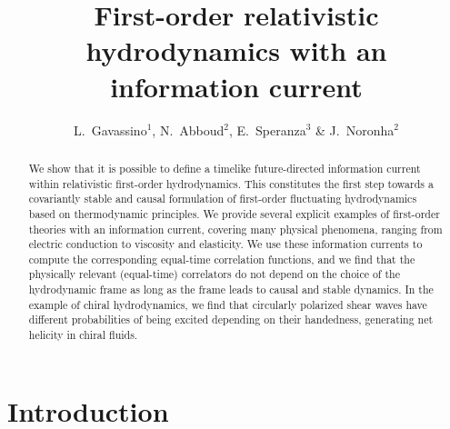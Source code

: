 \documentclass[a4paper, amsfonts, amssymb, amsmath, reprint, showkeys, nofootinbib, twoside,notitlepage,onecolumn,preprintnumbers]{revtex4-2}
\theoremstyle{definition}
\theoremstyle{theorem}
\theoremstyle{corollary}
\begin{document}
\title{First-order relativistic hydrodynamics with an information current}
\author{L.~Gavassino$^1$, N.~Abboud$^2$, E.~Speranza$^3$   \& J.~Noronha$^2$}

\begin{abstract}
We show that it is possible to define a timelike future-directed information current within relativistic first-order hydrodynamics. This constitutes the first step towards a covariantly stable and causal formulation of first-order fluctuating hydrodynamics based on thermodynamic principles. We provide several explicit examples of first-order theories with an information current, covering many physical phenomena, ranging from electric conduction to viscosity and elasticity. We use these information currents to compute the corresponding equal-time correlation functions, and we find that the physically relevant (equal-time) correlators do not depend on the choice of the hydrodynamic frame as long as the frame leads to causal and stable dynamics. In the example of chiral hydrodynamics, we find that circularly polarized shear waves have different probabilities of being excited depending on their handedness, generating net helicity in chiral fluids.
\end{abstract} 



\maketitle

\section{Introduction}
\end{document}
